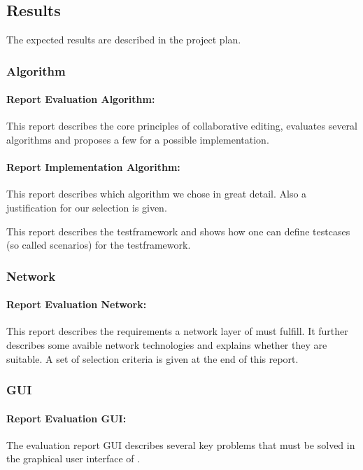 \documentclass[11pt,a4paper]{article}
\begin{document}
\subsection{Results}
The expected results are described in the project plan. 

\subsubsection{Algorithm}
\paragraph{Report Evaluation Algorithm:} 
This report describes the core principles of collaborative editing, evaluates several algorithms and proposes a few for a possible implementation.

\paragraph{Report Implementation Algorithm:} 
This report describes which algorithm we chose in great detail. Also a justification for our selection is given.

This report describes the testframework and shows how one can define testcases (so called scenarios) for the testframework.

\subsubsection{Network}
\paragraph{Report Evaluation Network:}
This report describes the requirements a network layer of \ace must fulfill. It further describes some avaible network technologies and explains whether they are suitable. A set of selection criteria is given at the end of this report.

\subsubsection{GUI}
\paragraph{Report Evaluation GUI:}
The evaluation report GUI describes several key problems that must be solved in the graphical user interface of \ace.
\end{document}
